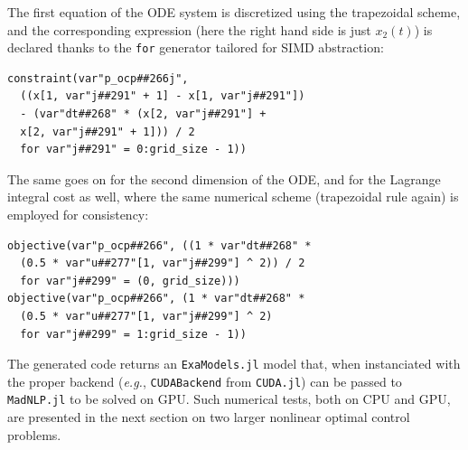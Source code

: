 \noindent The first equation of the ODE system is discretized using the trapezoidal scheme, and the corresponding expression (here the right hand side is just $x_2(t)$) is declared thanks to the \verb+for+ generator tailored for SIMD abstraction:

{\small
\begin{verbatim} 
constraint(var"p_ocp##266j",
  ((x[1, var"j##291" + 1] - x[1, var"j##291"])
  - (var"dt##268" * (x[2, var"j##291"] +
  x[2, var"j##291" + 1])) / 2
  for var"j##291" = 0:grid_size - 1))
\end{verbatim}
}

\noindent The same goes on for the second dimension of the ODE, and for the Lagrange integral cost as well, where the same numerical scheme (trapezoidal rule again) is employed for consistency:
 
{\small
\begin{verbatim}
objective(var"p_ocp##266", ((1 * var"dt##268" *
  (0.5 * var"u##277"[1, var"j##299"] ^ 2)) / 2
  for var"j##299" = (0, grid_size)))
objective(var"p_ocp##266", (1 * var"dt##268" *
  (0.5 * var"u##277"[1, var"j##299"] ^ 2)
  for var"j##299" = 1:grid_size - 1))
\end{verbatim}
}

\noindent The generated code returns an \texttt{ExaModels.jl} model that, when instanciated with the proper backend (\emph{e.g.}, \verb+CUDABackend+ from \texttt{CUDA.jl}) can be passed to \texttt{MadNLP.jl} to be solved on GPU. Such numerical tests, both on CPU and GPU, are presented in the next section on two larger nonlinear optimal control problems.
           
